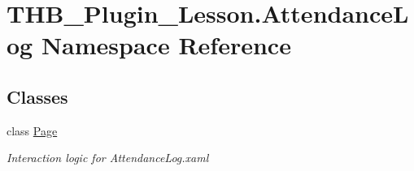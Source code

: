 \hypertarget{namespace_t_h_b___plugin___lesson_1_1_attendance_log}{}\section{T\+H\+B\+\_\+\+Plugin\+\_\+\+Lesson.\+Attendance\+Log Namespace Reference}
\label{namespace_t_h_b___plugin___lesson_1_1_attendance_log}
\subsection*{Classes}
\begin{DoxyCompactItemize}
\item 
class \mbox{\hyperlink{class_t_h_b___plugin___lesson_1_1_attendance_log_1_1_page}{Page}}
\begin{DoxyCompactList}\small\item\em Interaction logic for Attendance\+Log.\+xaml \end{DoxyCompactList}\end{DoxyCompactItemize}
